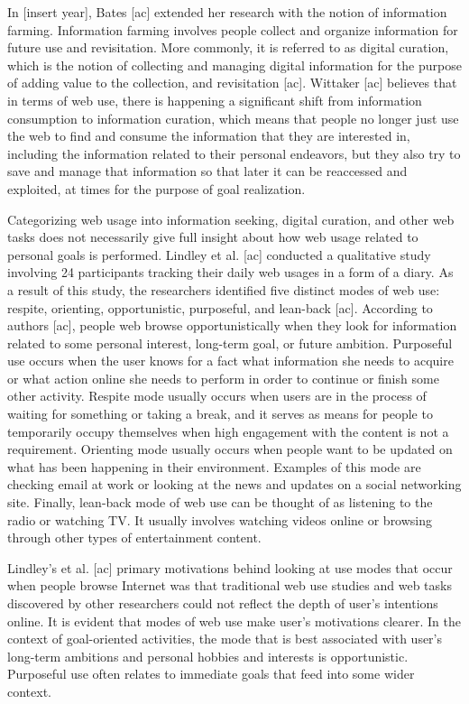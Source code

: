 \documentclass{casconpaper}
\begin{document}
{In [insert year], Bates [ac] extended her research with the notion of information farming. Information farming involves people collect and organize information for future use and revisitation. More commonly, it is referred to as digital curation, which is the notion of collecting and managing digital information for the purpose of adding value to the collection, and revisitation [ac]. Wittaker [ac] believes that in terms of web use, there is happening a significant shift from information consumption to information curation, which means that people no longer just use the web to find and consume the information that they are interested in, including the information related to their personal endeavors, but they also try to save and manage that information so that later it can be reaccessed and exploited, at times for the purpose of goal realization. 

Categorizing web usage into information seeking,  digital curation, and other web tasks does not necessarily give full insight about how web usage related to personal goals is performed. Lindley et al. [ac] conducted a qualitative study involving 24 participants tracking their daily web usages in a form of a diary. As a result of this study, the researchers identified five distinct modes of web use: respite, orienting, opportunistic, purposeful, and lean-back [ac]. According to authors [ac], people web browse opportunistically when they look for information related to some personal interest, long-term goal, or future ambition. Purposeful use occurs when the user knows for a fact what information she needs to acquire or what action online she needs to perform in order to continue or finish some other activity. Respite mode usually occurs when users are in the process of waiting for something or taking a break, and it serves as means for people to temporarily occupy themselves when high engagement with the content is not a requirement. Orienting mode usually occurs when people want to be updated on what has been happening in their environment. Examples of this mode are checking email at work or looking at the news and updates on a social networking site. Finally, lean-back mode of web use can be thought of as listening to the radio or watching TV. It usually involves watching videos online or browsing through other types of entertainment content. 

Lindley’s et al. [ac] primary motivations behind looking at use modes that occur when people browse Internet was that traditional web use studies and web tasks discovered by other researchers could not reflect the depth of user’s intentions online. It is evident that modes of web use make user’s motivations clearer. In the context of goal-oriented activities, the mode that is best associated with user’s long-term ambitions and personal hobbies and interests is opportunistic. Purposeful use often relates to immediate goals that feed into some wider context. 

}
\end{document}
